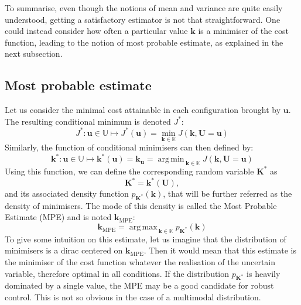 \documentclass[preprint, review, 1p]{elsarticle}
\DeclareMathOperator*{\argmin}{arg\,min \,}
\DeclareMathOperator*{\argmax}{arg\,max \,}
\newcommand{\kmpe}{{\mathbf{k}}_{\mathrm{MPE}}}
\newcommand{\Kspace}{\mathbb{K}}
\newcommand{\Uspace}{\mathbb{U}}
\begin{document}
To summarise, even though the notions of mean and variance are quite easily understood, getting a satisfactory estimator is not that straightforward. One could instead consider how often a particular value $\mathbf{k}$ is a minimiser of the cost function, leading to the notion of most probable estimate, as explained in the next subsection.

\subsection{Most probable estimate}
Let us consider the minimal cost attainable in each configuration brought by $\mathbf{u}$.
The resulting conditional minimum is denoted $J^*$:
\begin{equation}
\label{eq:def_Jstar}
J^*: \mathbf{u} \in\Uspace \longmapsto J^*(\mathbf{u}) = \min_{\mathbf{k}\in \Kspace} J(\mathbf{k},\mathbf{U}=\mathbf{u})
\end{equation}
Similarly, the function of conditional minimisers can then defined by:
  \begin{equation}
  \label{eq:conditional_minimiser}
   \mathbf{k}^*: \mathbf{u}\in\Uspace \longmapsto \mathbf{k}^*(\mathbf{u}) = \mathbf{k}_{\mathbf{u}}=  \argmin_{{\mathbf{k}}\in\Kspace} J({\mathbf{k}},\mathbf{U}=\mathbf{u})
  \end{equation}
Using this function, we can define the corresponding random variable $\mathbf{K}^*$ as
  \begin{equation}
    \label{eq:def_study_minimisers}
    \mathbf{K}^*= \mathbf{k}^*(\mathbf{U}),
  \end{equation}
and its associated density function $p_{\mathbf{K}^*}(\mathbf{k})$, that will be further referred as the density of minimisers.
The mode of this density is called the Most Probable Estimate (MPE) and is noted  $\kmpe$:
\begin{equation}
  \label{eq:MPE}
  \kmpe = \argmax_{\mathbf{k} \in\Kspace} p_{\mathbf{K}^*}(\mathbf{k}) 
\end{equation}
To give some intuition on this estimate, let us imagine that the distribution of minimisers is a dirac centered on $\kmpe$. Then it would mean that this estimate is the minimiser of the cost function whatever the realisation of the uncertain variable, therefore optimal in all conditions. 
If the distribution $p_{\mathbf{K}^*}$ is heavily dominated by a single value, the MPE may be a good candidate for robust control. This is not so obvious in the case of a multimodal distribution.
\end{document}
